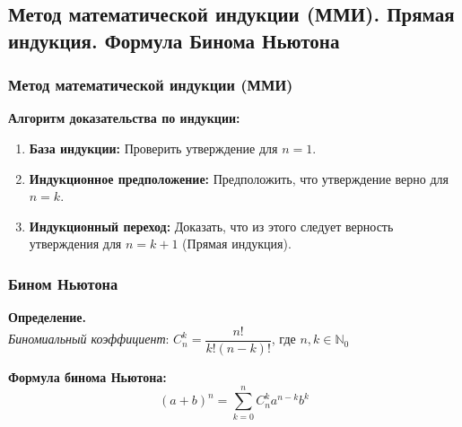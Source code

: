 \subsection{Метод математической индукции (ММИ). Прямая индукция. Формула Бинома Ньютона}

\subsubsection{Метод математической индукции (ММИ)}
\begin{tcolorbox}
\textbf{Алгоритм доказательства по индукции:}
\begin{enumerate}
    \item \textbf{База индукции:} Проверить утверждение для $n = 1$.
    \item \textbf{Индукционное предположение:} Предположить, что утверждение верно для $n = k$.
    \item \textbf{Индукционный переход:} Доказать, что из этого следует верность утверждения для $n = k+1$ (Прямая индукция).
\end{enumerate}
\end{tcolorbox}

\subsubsection{Бином Ньютона}
\begin{tcolorbox}
\textbf{Определение.}\\
\textit{Биномиальный коэффициент}:
$C_n^k = \dfrac{n!}{k!(n-k)!}$, где $n,k \in \mathbb{N}_0$\\
\end{tcolorbox}

\begin{tcolorbox}
\textbf{Формула бинома Ньютона:}
$$(a+b)^n = \sum_{k=0}^{n} C_n^k a^{n-k}b^k$$
\end{tcolorbox}

